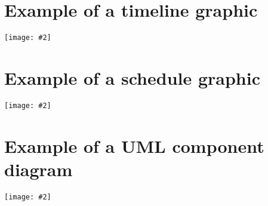 \documentclass[11pt]{article}
\newcommand{\demonstrate}[2]{%
  \begin{center}
  \texttt{[image: \#2]}
  \end{center}
}
\begin{document}
\section{Example of a timeline graphic}
\demonstrate{height=0.9\textheight}{example_timeline-0}
\section{Example of a schedule graphic}
\demonstrate{width=\textwidth}{example_schedule-0}
\section{Example of a UML component diagram}
\demonstrate{}{example_umlcomponent-0}
\end{document}
